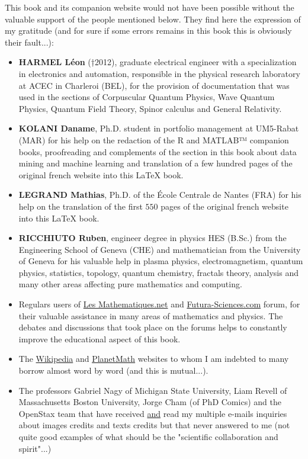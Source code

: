 \documentclass[12pt,a4paper,twoside,openright]{report}
\theoremstyle{definition}
\theoremstyle{itexmp}
\numberwithin{equation}{section}
\begin{document}
	This book and its companion website would not have been possible without the valuable support of the people mentioned below. They find here the expression of my gratitude (and for sure if some errors remains in this book this is obviously their fault...):
	
	\begin{itemize}		
		\item \textbf{HARMEL Léon }(†2012), graduate electrical engineer with a specialization in electronics and automation, responsible in the physical research laboratory at ACEC in Charleroi (BEL), for the provision of documentation that was used in the sections of Corpuscular Quantum Physics, Wave Quantum Physics,  Quantum Field Theory, Spinor calculus and General Relativity.
		
		\item \textbf{KOLANI Daname}, Ph.D. student in portfolio management at UM5-Rabat (MAR) for his help on the redaction of the R and MATLAB™ companion books, proofreading and complements of the section in this book about data mining and machine learning and translation of a few hundred pages of the original french website into this \LaTeX{} book.
		
		\item \textbf{LEGRAND Mathias}, Ph.D. of the École Centrale de Nantes (FRA) for his help on the translation of the first $550$  pages of the original french website into this \LaTeX{} book.
		
		\item \textbf{RICCHIUTO Ruben}, engineer degree in physics HES (B.Sc.) from the Engineering School of Geneva (CHE) and mathematician from the University of Geneva for his valuable help in plasma physics, electromagnetism, quantum physics, statistics, topology, quantum chemistry, fractals theory, analysis and many other areas affecting pure mathematics and computing.
		
		\item Regulars users of \href{http://www.les-mathematiques.net}{{\color{blue} Les Mathematiques.net}} and \href{http://www.futura-sciences.com}{{\color{blue} Futura-Sciences.com}} forum, for their valuable assistance in many areas of mathematics and physics. The debates and discussions that took place on the forums helps to constantly improve the educational aspect of this book.
		
		\item The \href{http://www.wikipedia.com}{{\color{blue} Wikipedia}} and \href{http://www.planetmath.com}{{\color{blue} PlanetMath}} websites to whom I am indebted to many borrow almost word by word (and this is mutual...).
		
		\item The professors Gabriel Nagy of Michigan State University, Liam Revell of Massachusetts Boston University, Jorge Cham (of PhD Comics) and the OpenStax team that have received \underline{and} read my multiple e-mails inquiries about images credits and texts credits but that never answered to me (not quite good examples of what should be the "scientific collaboration and spirit"...)
	\end{itemize}
	
\end{document}
